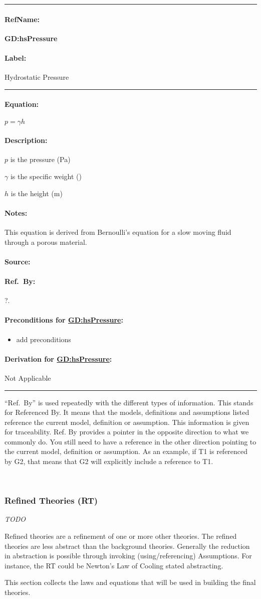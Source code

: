 \documentclass[12pt]{article}
\newcommand{\deftheory}[9][Not Applicable]
{
\newpage
\noindent \rule{\textwidth}{0.5mm}

\paragraph{RefName: } \textbf{#2} \phantomsection 
\label{#2}

\paragraph{Label:} #3

\noindent \rule{\textwidth}{0.5mm}

\paragraph{Equation:}

#4

\paragraph{Description:}

#5

\paragraph{Notes:}

#6

\paragraph{Source:}

#7

\paragraph{Ref.\ By:}

#8

\paragraph{Preconditions for \hyperref[#2]{#2}:}
\label{#2_precond}

#9

\paragraph{Derivation for \hyperref[#2]{#2}:}
\label{#2_deriv}

#1

\noindent \rule{\textwidth}{0.5mm}

}
\begin{document}
\deftheory
{GD:hsPressure}
{Hydrostatic Pressure}
{
\( p = \gamma h \)
}
{
\begin{symbDescription}
  \item{$p$ is the pressure (\si{\pascal})}
  \item{$\gamma$ is the specific weight (\si{\frac{\newton}{\metre\cubed}})}
  \item{$h$ is the height (\si{\metre})}
\end{symbDescription}
}
{
  This equation is derived from Bernoulli's equation for a slow moving fluid through a porous material.
}
{
\citet{WikipediaPressure}
}
{
?.
}
{
\begin{itemize}
\item add preconditions
\end{itemize}
}
{}


\bigskip

``Ref.\ By'' is used repeatedly with the different types of information. This
stands for Referenced By.  It means that the models, definitions and assumptions
listed reference the current model, definition or assumption. This information
is given for traceability.  Ref. By provides a pointer in the opposite direction
to what we commonly do.  You still need to have a reference in the other
direction pointing to the current model, definition or assumption.  As an
example, if T1 is referenced by G2, that means that G2 will explicitly include a
reference to T1.

~\newline

\subsubsection{Refined Theories (RT)}\label{sec_gendef}

\emph{TODO}

Refined theories are a refinement of one or more other theories. The refined theories are less abstract than the background theories.  Generally the reduction in
abstraction is possible through invoking (using/referencing) Assumptions. For
instance, the RT could be Newton's Law of Cooling stated abstracting.

This section collects the laws and equations that will be used in building the
final theories.
\end{document}
